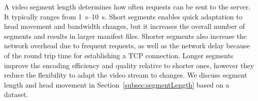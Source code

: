

A video segment length determines how
often requests can be sent to the server. It typically ranges from
\SIrange{1}{10}{\second}. Short segments enables quick
adaptation to head movement and bandwidth changes, but it increases
the overall number of segments and results in larger manifest files.
Shorter segments also increase the network overhead due to
frequent requests, as well as the network delay because of the round
trip time for establishing a TCP connection.
Longer segments improve the encoding efficiency and quality relative to
shorter ones, however they reduce the flexibility to adapt the video
stream to changes. We discuss segment length and head movement in
Section~\ref{subsec:segmentLength} based on a dataset.



